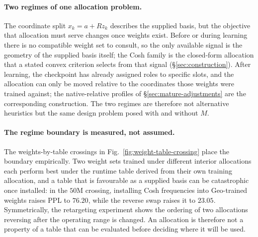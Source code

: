 %

\paragraph{Two regimes of one allocation problem.}
The coordinate split $x_k = a + R z_k$ describes the supplied basis, but the
objective that allocation must serve changes once weights exist. Before or during
learning there is no compatible weight set to consult, so the only available signal
is the geometry of the supplied basis itself; the Cosh family is the closed-form
allocation that a stated convex criterion selects from that signal
(\S\ref{sec:construction}). After learning, the checkpoint has already assigned
roles to specific slots, and the allocation can only be moved relative to the
coordinates those weights were trained against; the native-relative profiles
of \S\ref{sec:mature-adjustments} are the corresponding construction. The two
regimes are therefore not alternative heuristics but the same design problem posed
with and without $M$.

\paragraph{The regime boundary is measured, not assumed.}
The weights-by-table crossings in Fig.~\ref{fig:weight-table-crossing} place the
boundary empirically. Two weight sets trained under different interior allocations
each perform best under the runtime table derived from their own training
allocation, and a table that is favourable as a supplied basis can be catastrophic
once installed: in the $50$M crossing, installing Cosh frequencies into
Geo-trained weights raises PPL to $76.20$, while the reverse swap raises it to
$23.05$. Symmetrically, the retargeting experiment shows the ordering of two
allocations reversing after the operating range is changed. An allocation is
therefore not a property of a table that can be evaluated before deciding where
it will be used.

